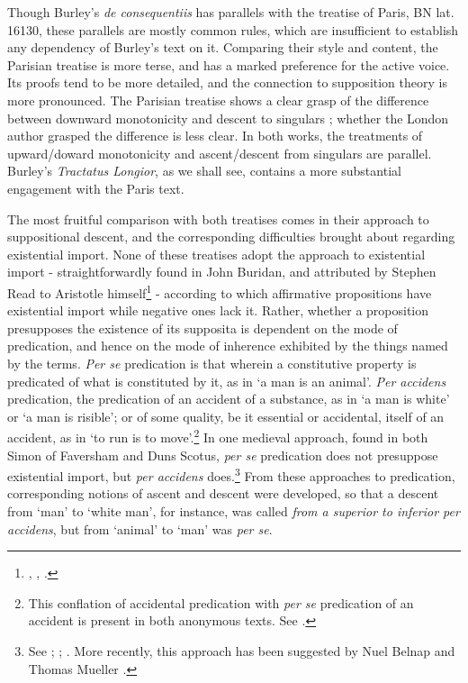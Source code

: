 \documentclass[]{article}
\begin{document}
Though Burley's \textit{de consequentiis} has parallels with the treatise of Paris, BN lat. 16130, these parallels are mostly common rules, which are insufficient to establish any dependency of Burley's text on it. Comparing their style and content, the Parisian treatise is more terse, and has a marked preference for the active voice. Its proofs tend to be more detailed, and the connection to supposition theory is more pronounced. The Parisian treatise shows a clear grasp of the difference between downward monotonicity and descent to singulars \cite[p. 12, par. 2]{Green-Pedersen1980a}; whether the London author grasped the difference is less clear. In both works, the treatments of upward/doward monotonicity and ascent/descent from singulars are parallel. Burley's \textit{Tractatus Longior}, as we shall see, contains a more substantial engagement with the Paris text.

The most fruitful comparison with both treatises comes in their approach to suppositional descent, and the corresponding difficulties brought about regarding existential import. None of these treatises adopt the approach to existential import - straightforwardly found in John Buridan, and  attributed by Stephen Read to Aristotle himself\footnote{\cite[q. I. 38]{BuridanPostAn}, \cite{Klima2001}, \cite{Read2015b}.} - according to which affirmative propositions have existential import while negative ones lack it. Rather, whether a proposition presupposes the existence of its supposita is dependent on the mode of predication, and hence on the mode of inherence exhibited by the things named by the terms. \textit{Per se} predication is that wherein a constitutive property is predicated of what is constituted by it, as in `a man is an animal'. \textit{Per accidens} predication, the predication of an accident of a substance, as in `a man is white' or `a man is risible'; or of some quality, be it essential or accidental, itself of an accident, as in `to run is to move'.\footnote{This conflation of accidental predication with \textit{per se} predication of an accident is present in both anonymous texts. See \cite[pp. 10-11, par. 35-36; 25, par. 66]{Green-Pedersen1980a}.} In one medieval approach, found in both Simon of Faversham and Duns Scotus, \textit{per se} predication does not presuppose existential import, but \textit{per accidens} does.\footnote{See \cite[q. I. 56]{FavershamQE}; \cite[I. qq. 5-8. par. 49, 74]{ScotusPeriHerm}; \cite[q. 11, par. 19]{ScotusQE}. More recently, this approach has been suggested by Nuel Belnap and Thomas Mueller \cite{CIFOL1}.} From these approaches to predication, corresponding notions of ascent and descent were developed, so that a descent from `man' to `white man', for instance, was called \textit{from a superior to inferior per accidens}, but from `animal' to `man' was \textit{per se}. 
\end{document}
